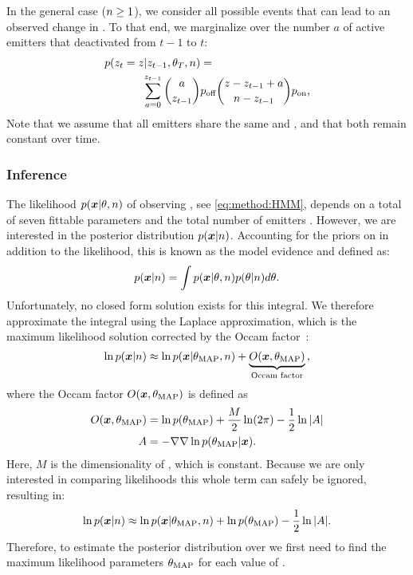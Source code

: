 In the general case ($n\geq1$), we consider all possible events that can
lead to an observed change in \z{}. To that end, we marginalize over the
number $a$ of active emitters that deactivated from $t-1$ to $t$:
  \begin{align}
    \label{eq:method:transition}
    p(z_{t} = z | z_{t-1}, \theta_{T}, n) &=\\
    \sum_{a = 0}^{z_{t-1}}
      {a \choose z_{t-1}}
      &\poff
      {z - z_{t-1} + a \choose \n - z_{t-1}}
      \pon
      \text{,} \notag
  \end{align}
  Note that we assume that all emitters share the same \pon and \poff, and that
  both remain constant over time.

\subsubsection{Inference}

The likelihood $p(\bm{x}|\theta,n)$ of observing \trace, see
\eqref{eq:method:HMM}, depends on a total of seven fittable parameters
\parameters and the total number of emitters \n.
  However, we are interested in the posterior distribution $p(\bm{x}|n)$.
  Accounting for the priors on \parameters in addition to the likelihood,
  this is known as the model evidence and defined as:
  \begin{equation*}
    p(\bm{x} | n) = \int p(\bm{x} | \theta, n) p(\theta | n) d\theta
    \text{.}
  \end{equation*}
  Unfortunately, no closed form solution exists for this integral. We therefore
  approximate the integral using the Laplace approximation, which is the
  maximum likelihood solution corrected by the Occam
  factor~\citep{bishop_pattern_2006}:
  \begin{equation}
    \ln p(\bm{x} | n) \approx
      \ln p(\bm{x} | \theta_\text{MAP}, n) +
      \underbrace{O(\bm{x}, \theta_\text{MAP})}_\text{Occam factor}
    \text{,}
    \label{eq:method:evidence_with_m}
  \end{equation}
  where the Occam factor $O(\bm{x}, \theta_\text{MAP})$ is defined as
  \begin{align*}
    O(\bm{x}, \theta_\text{MAP}) &=
      \ln p(\theta_\text{MAP}) +
      \frac{M}{2} \ln(2\pi) -
      \frac{1}{2} \ln |A|
    \\
    A &=
      -\nabla \nabla \ln p(\theta_\text{MAP} | \bm{x})
    \text{.}
  \end{align*}
  Here, $M$ is the dimensionality of \parameters, which is constant.
  Because we are only interested in comparing likelihoods this whole term can 
  safely be ignored, resulting in:
  \begin{equation}
    \ln p(\bm{x} | n) \approx \ln p(\bm{x} | \theta_\text{MAP}, n) + \ln p(\theta_\text{MAP}) - \frac{1}{2} \ln |A|
    \text{.}
    \label{eq:method:evidence}
  \end{equation}
  Therefore, to estimate the posterior distribution over \n we first need to 
  find the maximum likelihood parameters $\theta_\text{MAP}$ for each value of \n. 

